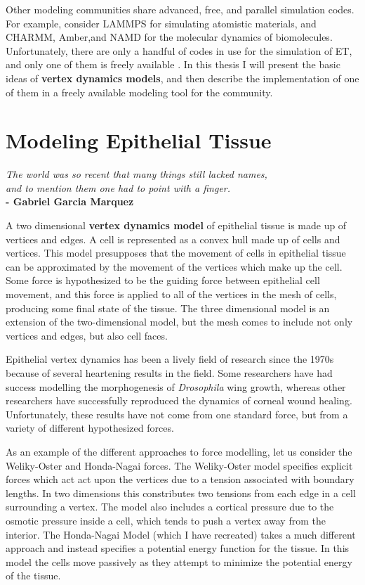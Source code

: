 Other modeling communities share advanced, free, and parallel simulation codes. For example, consider LAMMPS for simulating atomistic materials, and CHARMM, Amber,and NAMD for the molecular dynamics of biomolecules. Unfortunately, there are only a handful of codes in use for the simulation of ET, and only one of them is freely available \cite{ChasteMain}. In this thesis I will present the basic ideas of \textbf{vertex dynamics models}, and then describe the implementation of one of them in a freely available modeling tool for the community.

\section{Modeling Epithelial Tissue}
\begin{center}
\emph{The world was so recent that many things still lacked names,}\\
\emph{and to mention them one had to point with a finger. }\\
\textbf{\hspace{10ex} - Gabriel Garcia Marquez}
\end{center}
A two dimensional \textbf{vertex dynamics model} of epithelial tissue is made up of vertices and edges. A cell is represented as a convex hull made up of cells and vertices. This model presupposes that the movement of cells in epithelial tissue can be approximated by the movement of the vertices which make up the cell. Some force is hypothesized to be the guiding force between epithelial cell movement, and this force is applied to all of the vertices in the mesh of cells, producing some final state of the tissue. The three dimensional model is an extension of the two-dimensional model, but the mesh comes to include not only vertices and edges, but also cell faces. 

Epithelial vertex dynamics has been a lively field of research since the 1970s because of several heartening results in the field. Some researchers have had success modelling the morphogenesis of \emph{Drosophila} wing growth, whereas other researchers have successfully reproduced the dynamics of corneal wound healing. Unfortunately, these results have not come from one standard force, but from a variety of different hypothesized forces.

As an example of the different approaches to force modelling, let us consider the Weliky-Oster and Honda-Nagai forces. The Weliky-Oster model specifies explicit forces which act act upon the vertices due to a tension associated with boundary lengths. In two dimensions this constributes two tensions from each edge in a cell surrounding a vertex. The model also includes a cortical pressure due to the osmotic pressure inside a cell, which tends to push a vertex away from the interior. The Honda-Nagai Model (which I have recreated) takes a much different approach and instead specifies a potential energy function for the tissue. In this model the cells move passively as they attempt to minimize the potential energy of the tissue\cite{Vertex Models}. 

